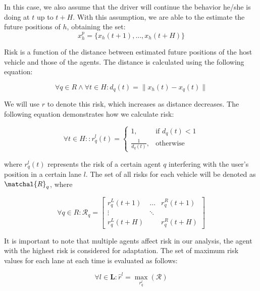\documentclass[conference]{IEEEtran}
\begin{document}
In this case, we also assume that the driver will continue the behavior he/she is doing at $t$ up to $t+H$. With this assumption, we are able to the estimate the future positions of $h$, obtaining the set:
\begin{equation}
    x_h^p = \{x_h(t+1),\ldots,x_h(t+H)\}
\end{equation}

Risk is a function of the distance between estimated future positions of the host vehicle and those of the agents. The distance is calculated using the following equation:

\begin{equation}
    \forall q \in R \land \forall t\in H : d_q(t) = \lVert x_h(t)-x_q(t)\rVert
\end{equation}

We will use $r$ to denote this risk, which increases as distance decreases. The following equation demonstrates how we calculate risk:

\begin{equation}
\forall{t}\in H::
    r_{q}^{l}(t) =
    \begin{cases}
    1,                      & \text{if } d_{q}(t) < 1 \\
    \frac{1}{d_{q}(t)},  & \text{otherwise} 
    \end{cases}
\end{equation}

where $r_{q}^{l}(t)$ represents the risk of a certain agent $q$ interfering with the user's position in a certain lane $l$. The set of all risks for each vehicle will be denoted as $\matchal{R}_q$, where

\begin{equation}
    \forall{q} \in R: \mathcal{R}_q =
                    \begin{bmatrix}
                        r_q^L(t+1) & \dots & r_q^R(t+1) \\
                        \vdots & \ddots & \\
                        r_q^L(t+H) &    & r_q^R(t+H)
                    \end{bmatrix}
\end{equation}

It is important to note that multiple agents affect risk in our analysis, the agent with the highest risk is considered for adaptation. The set of maximum risk values for each lane at each time is evaluated as follows:

\begin{equation}
    \forall{l}\in\mathbf{L}:\hat{r}^l =  \max_{r_{q}^{l}}(\mathcal{R})
\end{equation}
\end{document}
